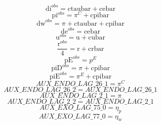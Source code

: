 \begin{dmath}
{{\mathrm{di}^{obs}}}={{\mathrm{ctaubar}}}+{{\mathrm{cebar}}}
\end{dmath}
\begin{dmath}
{{\mathrm{pi}^{obs}}}={{\pi^{C}}}+{{\mathrm{cpibar}}}
\end{dmath}
\begin{dmath}
{{\mathrm{dw}^{obs}}}={{\pi}}+{{\mathrm{ctaubar}}}+{{\mathrm{cpibar}}}
\end{dmath}
\begin{dmath}
{{\mathrm{de}^{obs}}}={{\mathrm{cebar}}}
\end{dmath}
\begin{dmath}
{{\mathrm{u}^{obs}}}={{\mathrm{u}}}+{{\mathrm{cubar}}}
\end{dmath}
\begin{dmath}
\frac{{{\mathrm{r}^{obs}}}}{4}={{\mathrm{r}}}+{{\mathrm{crbar}}}
\end{dmath}
\begin{dmath}
{{\mathrm{pE}^{obs}}}={{p^{E}}}
\end{dmath}
\begin{dmath}
{{\mathrm{piD}^{obs}}}={{\pi}}+{{\mathrm{cpibar}}}
\end{dmath}
\begin{dmath}
{{\mathrm{piE}^{obs}}}={{\pi^{E}}}+{{\mathrm{cpibar}}}
\end{dmath}
\begin{dmath}
{AUX\_ENDO\_LAG\_26\_1}={{\pi^{C}}}
\end{dmath}
\begin{dmath}
{AUX\_ENDO\_LAG\_26\_2}={AUX\_ENDO\_LAG\_26\_1}
\end{dmath}
\begin{dmath}
{AUX\_ENDO\_LAG\_2\_1}={{\pi}}
\end{dmath}
\begin{dmath}
{AUX\_ENDO\_LAG\_2\_2}={AUX\_ENDO\_LAG\_2\_1}
\end{dmath}
\begin{dmath}
{AUX\_EXO\_LAG\_75\_0}={{\eta_{p}}}
\end{dmath}
\begin{dmath}
{AUX\_EXO\_LAG\_77\_0}={{\eta_{w}}}
\end{dmath}
